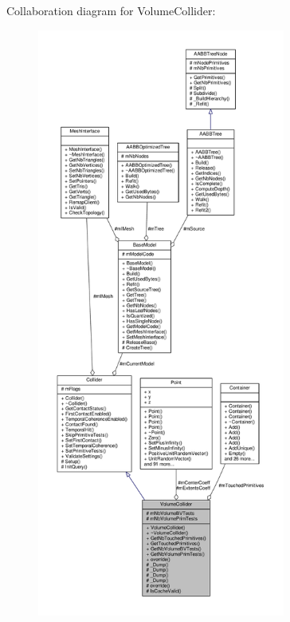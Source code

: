 Collaboration diagram for Volume\+Collider\+:
\nopagebreak
\begin{figure}[H]
\begin{center}
\leavevmode
\includegraphics[height=550pt]{d6/de6/classVolumeCollider__coll__graph}
\end{center}
\end{figure}
